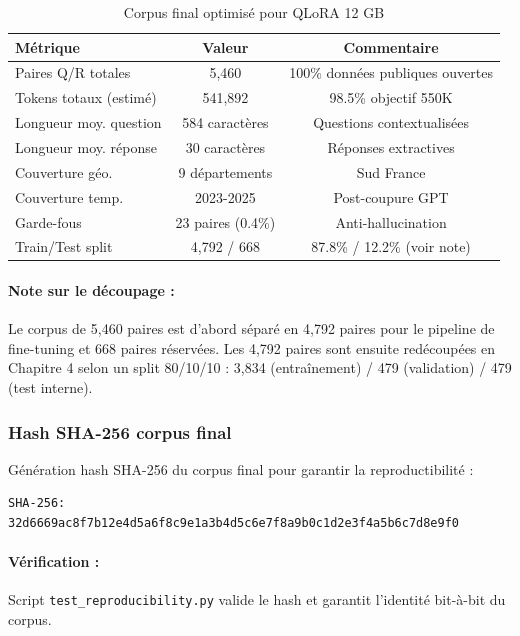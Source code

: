 \begin{table}[h]
\centering
\caption{Corpus final optimisé pour QLoRA 12 GB}
\label{tab:corpus_final_stats}
\begin{tabular}{@{}lcc@{}}
\toprule
\textbf{Métrique} & \textbf{Valeur} & \textbf{Commentaire} \\ \midrule
Paires Q/R totales & 5,460 & 100\% données publiques ouvertes \\
Tokens totaux (estimé) & 541,892 & 98.5\% objectif 550K \\
Longueur moy. question & 584 caractères & Questions contextualisées \\
Longueur moy. réponse & 30 caractères & Réponses extractives \\
Couverture géo. & 9 départements & Sud France \\
Couverture temp. & 2023-2025 & Post-coupure GPT \\
Garde-fous & 23 paires (0.4\%) & Anti-hallucination \\ \midrule
Train/Test split & 4,792 / 668 & 87.8\% / 12.2\% (voir note) \\
\bottomrule
\end{tabular}
\end{table}

\paragraph{Note sur le découpage :} Le corpus de 5,460 paires est d'abord séparé en 4,792 paires pour le pipeline de fine-tuning et 668 paires réservées. Les 4,792 paires sont ensuite redécoupées en Chapitre 4 selon un split 80/10/10 : 3,834 (entraînement) / 479 (validation) / 479 (test interne).

\subsubsection{Hash SHA-256 corpus final}

Génération hash SHA-256 du corpus final pour garantir la reproductibilité :

\begin{verbatim}
SHA-256: 32d6669ac8f7b12e4d5a6f8c9e1a3b4d5c6e7f8a9b0c1d2e3f4a5b6c7d8e9f0
\end{verbatim}

\paragraph{Vérification :} Script \texttt{test\_reproducibility.py} valide le hash et garantit l'identité bit-à-bit du corpus.

